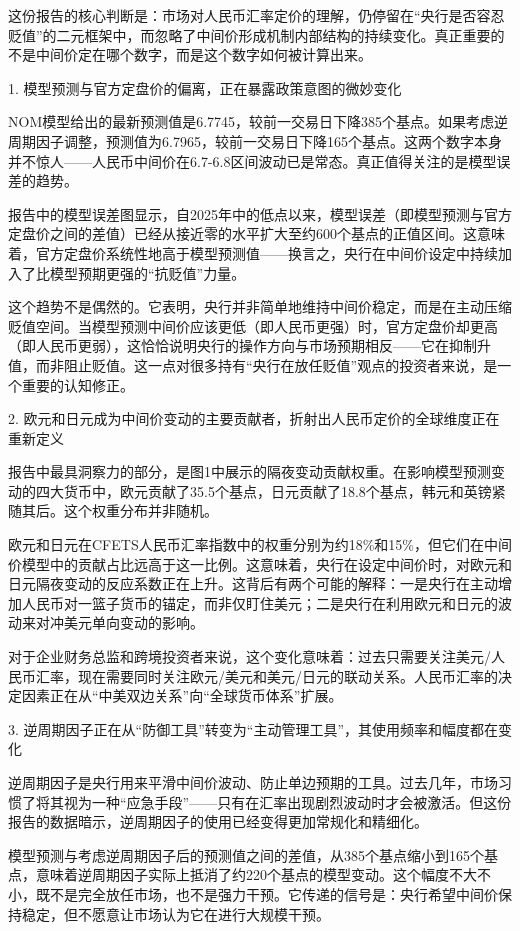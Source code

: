 \documentclass[11pt]{ctexart}
\begin{document}
这份报告的核心判断是：市场对人民币汇率定价的理解，仍停留在“央行是否容忍贬值”的二元框架中，而忽略了中间价形成机制内部结构的持续变化。真正重要的不是中间价定在哪个数字，而是这个数字如何被计算出来。

1. 模型预测与官方定盘价的偏离，正在暴露政策意图的微妙变化

NOM模型给出的最新预测值是6.7745，较前一交易日下降385个基点。如果考虑逆周期因子调整，预测值为6.7965，较前一交易日下降165个基点。这两个数字本身并不惊人——人民币中间价在6.7-6.8区间波动已是常态。真正值得关注的是模型误差的趋势。

报告中的模型误差图显示，自2025年中的低点以来，模型误差（即模型预测与官方定盘价之间的差值）已经从接近零的水平扩大至约600个基点的正值区间。这意味着，官方定盘价系统性地高于模型预测值——换言之，央行在中间价设定中持续加入了比模型预期更强的“抗贬值”力量。

这个趋势不是偶然的。它表明，央行并非简单地维持中间价稳定，而是在主动压缩贬值空间。当模型预测中间价应该更低（即人民币更强）时，官方定盘价却更高（即人民币更弱），这恰恰说明央行的操作方向与市场预期相反——它在抑制升值，而非阻止贬值。这一点对很多持有“央行在放任贬值”观点的投资者来说，是一个重要的认知修正。

2. 欧元和日元成为中间价变动的主要贡献者，折射出人民币定价的全球维度正在重新定义

报告中最具洞察力的部分，是图1中展示的隔夜变动贡献权重。在影响模型预测变动的四大货币中，欧元贡献了35.5个基点，日元贡献了18.8个基点，韩元和英镑紧随其后。这个权重分布并非随机。

欧元和日元在CFETS人民币汇率指数中的权重分别为约18\%和15\%，但它们在中间价模型中的贡献占比远高于这一比例。这意味着，央行在设定中间价时，对欧元和日元隔夜变动的反应系数正在上升。这背后有两个可能的解释：一是央行在主动增加人民币对一篮子货币的锚定，而非仅盯住美元；二是央行在利用欧元和日元的波动来对冲美元单向变动的影响。

对于企业财务总监和跨境投资者来说，这个变化意味着：过去只需要关注美元/人民币汇率，现在需要同时关注欧元/美元和美元/日元的联动关系。人民币汇率的决定因素正在从“中美双边关系”向“全球货币体系”扩展。

3. 逆周期因子正在从“防御工具”转变为“主动管理工具”，其使用频率和幅度都在变化

逆周期因子是央行用来平滑中间价波动、防止单边预期的工具。过去几年，市场习惯了将其视为一种“应急手段”——只有在汇率出现剧烈波动时才会被激活。但这份报告的数据暗示，逆周期因子的使用已经变得更加常规化和精细化。

模型预测与考虑逆周期因子后的预测值之间的差值，从385个基点缩小到165个基点，意味着逆周期因子实际上抵消了约220个基点的模型变动。这个幅度不大不小，既不是完全放任市场，也不是强力干预。它传递的信号是：央行希望中间价保持稳定，但不愿意让市场认为它在进行大规模干预。
\end{document}
